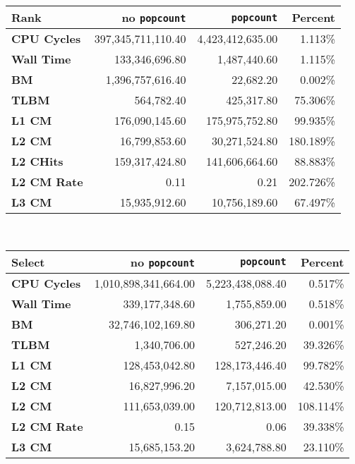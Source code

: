 \begin{tabular}{|lrrr|}
\hline
\textbf{Rank} & no \texttt{popcount} & \texttt{popcount} & Percent \\ \hline
\textbf{CPU Cycles} & 397,345,711,110.40 & 4,423,412,635.00 & 1.113\% \\ \hline
\textbf{Wall Time} & 133,346,696.80 & 1,487,440.60 & 1.115\% \\ \hline
\textbf{BM} & 1,396,757,616.40 & 22,682.20 & 0.002\% \\ \hline
\textbf{TLBM} & 564,782.40 & 425,317.80 & 75.306\% \\ \hline
\textbf{L1 CM} & 176,090,145.60 & 175,975,752.80 & 99.935\% \\ \hline
\textbf{L2 CM} & 16,799,853.60 & 30,271,524.80 & 180.189\% \\ \hline
\textbf{L2 CHits} & 159,317,424.80 & 141,606,664.60 & 88.883\% \\ \hline
\textbf{L2 CM Rate} & 0.11 & 0.21 & 202.726\% \\ \hline
\textbf{L3 CM} & 15,935,912.60 & 10,756,189.60 & 67.497\% \\ \hline
\end{tabular}\\[5pt]
\begin{tabular}{|lrrr|}
\hline
\textbf{Select} & no \texttt{popcount} & \texttt{popcount} & Percent \\ \hline
\textbf{CPU Cycles} & 1,010,898,341,664.00 & 5,223,438,088.40 & 0.517\% \\ \hline
\textbf{Wall Time} & 339,177,348.60 & 1,755,859.00 & 0.518\% \\ \hline
\textbf{BM} & 32,746,102,169.80 & 306,271.20 & 0.001\% \\ \hline
\textbf{TLBM} & 1,340,706.00 & 527,246.20 & 39.326\% \\ \hline
\textbf{L1 CM} & 128,453,042.80 & 128,173,446.40 & 99.782\% \\ \hline
\textbf{L2 CM} & 16,827,996.20 & 7,157,015.00 & 42.530\% \\ \hline
\textbf{L2 CM} & 111,653,039.00 & 120,712,813.00 & 108.114\% \\ \hline
\textbf{L2 CM Rate} & 0.15 & 0.06 & 39.338\% \\ \hline
\textbf{L3 CM} & 15,685,153.20 & 3,624,788.80 & 23.110\% \\ \hline
\end{tabular}\\[5pt]
